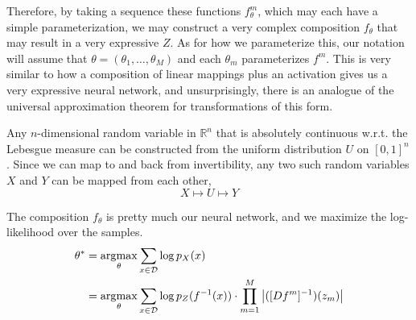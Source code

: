   Therefore, by taking a sequence these functions $f^m_\theta$, which may each have a simple parameterization, we may construct a very complex composition $f_\theta$ that may result in a very expressive $Z$. As for how we parameterize this, our notation will assume that $\theta = (\theta_1, \ldots, \theta_M)$ and each $\theta_m$ parameterizes $f^m$. This is very similar to how a composition of linear mappings plus an activation gives us a very expressive neural network, and unsurprisingly, there is an analogue of the universal approximation theorem for transformations of this form. 

  \begin{theorem} 
    Any $n$-dimensional random variable in $\mathbb{R}^n$ that is absolutely continuous w.r.t. the Lebesgue measure can be constructed from the uniform distribution $U$ on $[0, 1]^n$. Since we can map to and back from invertibility, any two such random variables $X$ and $Y$ can be mapped from each other, 
    \begin{equation}
      X \mapsto U \mapsto Y 
    \end{equation}
  \end{theorem} 

  The composition $f_\theta$ is pretty much our neural network, and we maximize the log-likelihood over the samples. 
  \begin{align}
    \theta^\ast & = \argmax_{\theta} \sum_{x \in \mathcal{D}} \log p_X (x) \\  
                & = \argmax_{\theta} \sum_{x \in \mathcal{D}} \log p_Z (f^{-1} (x)) \cdot \prod_{m=1}^M \big|([D f^m]^{-1})(z_m) \big|
  \end{align}

